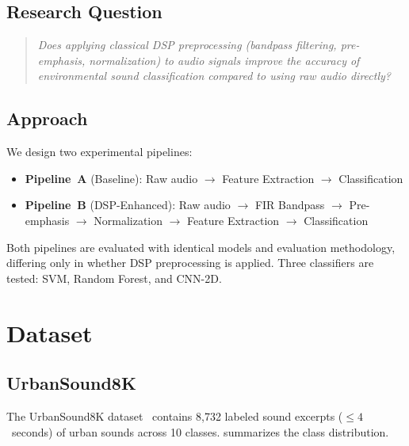 \documentclass[conference]{IEEEtran}
\newcommand{\pipeA}{\textbf{Pipeline~A}}
\newcommand{\pipeB}{\textbf{Pipeline~B}}
\newcommand{\US}{UrbanSound8K}
\begin{document}
\subsection{Research Question}

\begin{quote}
\textit{Does applying classical DSP preprocessing (bandpass filtering, pre-emphasis, normalization) to audio signals improve the accuracy of environmental sound classification compared to using raw audio directly?}
\end{quote}

\subsection{Approach}

We design two experimental pipelines:
\begin{itemize}
    \item \pipeA{} (Baseline): Raw audio $\rightarrow$ Feature Extraction $\rightarrow$ Classification
    \item \pipeB{} (DSP-Enhanced): Raw audio $\rightarrow$ FIR Bandpass $\rightarrow$ Pre-emphasis $\rightarrow$ Normalization $\rightarrow$ Feature Extraction $\rightarrow$ Classification
\end{itemize}

Both pipelines are evaluated with identical models and evaluation methodology, differing only in whether DSP preprocessing is applied. Three classifiers are tested: SVM, Random Forest, and CNN-2D.

\section{Dataset}
\label{sec:dataset}

\subsection{UrbanSound8K}

The \US{} dataset~\cite{salamon2014} contains 8,732 labeled sound excerpts ($\leq 4$~seconds) of urban sounds across 10 classes.  summarizes the class distribution.
\end{document}
